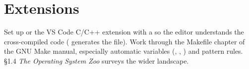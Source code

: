 \documentclass[11pt,a4paper]{article}
\begin{document}
\section{Extensions}

Set up  or the VS Code C/C++ extension with a  so
the editor understands the cross-compiled code ( generates the file). Work through the Makefile
chapter of the GNU Make manual, especially automatic variables (, \code{$<}, \code{$^}) and pattern rules.
\MOS\,\S1.4 \emph{The Operating System Zoo} surveys the wider landscape.

\booklegend
\end{document}
